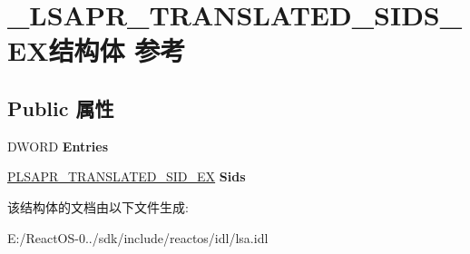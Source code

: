 \hypertarget{struct___l_s_a_p_r___t_r_a_n_s_l_a_t_e_d___s_i_d_s___e_x}{}\section{\+\_\+\+L\+S\+A\+P\+R\+\_\+\+T\+R\+A\+N\+S\+L\+A\+T\+E\+D\+\_\+\+S\+I\+D\+S\+\_\+\+E\+X结构体 参考}
\label{struct___l_s_a_p_r___t_r_a_n_s_l_a_t_e_d___s_i_d_s___e_x}
\subsection*{Public 属性}
\begin{DoxyCompactItemize}
\item 
\mbox{\label{struct___l_s_a_p_r___t_r_a_n_s_l_a_t_e_d___s_i_d_s___e_x_a9a2fccf2ee126bdf413ace9a3fab2e80}} 
D\+W\+O\+RD {\bfseries Entries}
\item 
\mbox{\label{struct___l_s_a_p_r___t_r_a_n_s_l_a_t_e_d___s_i_d_s___e_x_a1ac4adb704cf2aa1e61aed1c802e3376}} 
\hyperlink{struct___l_s_a_p_r___t_r_a_n_s_l_a_t_e_d___s_i_d___e_x}{P\+L\+S\+A\+P\+R\+\_\+\+T\+R\+A\+N\+S\+L\+A\+T\+E\+D\+\_\+\+S\+I\+D\+\_\+\+EX} {\bfseries Sids}
\end{DoxyCompactItemize}


该结构体的文档由以下文件生成\+:\begin{DoxyCompactItemize}
\item 
E\+:/\+React\+O\+S-\/0../sdk/include/reactos/idl/lsa.\+idl\end{DoxyCompactItemize}
